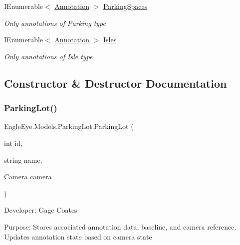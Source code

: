 \begin{DoxyCompactItemize}
I\+Enumerable$<$ \mbox{\hyperlink{class_eagle_eye_1_1_models_1_1_annotation}{Annotation}} $>$ \mbox{\hyperlink{class_eagle_eye_1_1_models_1_1_parking_lot_af3127595a546a4f0b4c4dcda6e72fc3f}{Parking\+Spaces}}
\begin{DoxyCompactList}\small\item\em Only annotations of Parking type \end{DoxyCompactList}\item 
I\+Enumerable$<$ \mbox{\hyperlink{class_eagle_eye_1_1_models_1_1_annotation}{Annotation}} $>$ \mbox{\hyperlink{class_eagle_eye_1_1_models_1_1_parking_lot_ac1070fa7799989793d2b8cf0c54318b3}{Isles}}
\begin{DoxyCompactList}\small\item\em Only annotations of Isle type \end{DoxyCompactList}\end{DoxyCompactItemize}


\subsection{Constructor \& Destructor Documentation}
\mbox{\label{class_eagle_eye_1_1_models_1_1_parking_lot_a02ac70305c0a604f9123ccdb0aa5d323}} 
\subsubsection{\texorpdfstring{ParkingLot()}{ParkingLot()}}
{\footnotesize\ttfamily Eagle\+Eye.\+Models.\+Parking\+Lot.\+Parking\+Lot (\begin{DoxyParamCaption}\item[{int}]{id,  }\item[{string}]{name,  }\item[{\mbox{\hyperlink{class_eagle_eye_1_1_models_1_1_camera}{Camera}}}]{camera }\end{DoxyParamCaption})}



Developer\+: Gage Coates 

Purpose\+: Stores accociated annotation data, baseline, and camera reference. Updates annotation state based on camera state

